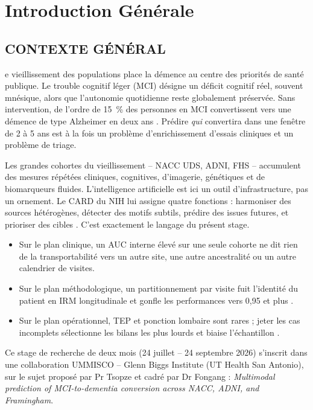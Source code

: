 \chapter*{Introduction Générale}
\label{chap:intro}
\adjustmtc

\section*{CONTEXTE GÉNÉRAL}
e vieillissement des populations place la démence au centre des priorités de santé publique. Le trouble cognitif léger (\ac{MCI}) désigne un déficit cognitif réel, souvent mnésique, alors que l'autonomie quotidienne reste globalement préservée. Sans intervention, de l'ordre de 15~\% des personnes en MCI convertissent vers une démence de type Alzheimer en deux ans \cite{chen2024probast,petersen2018mci}. Prédire \emph{qui} convertira dans une fenêtre de 2 à 5 ans est à la fois un problème d'enrichissement d'essais cliniques et un problème de triage.

Les grandes cohortes du vieillissement -- \ac{NACC} \ac{UDS}, \ac{ADNI}, \ac{FHS} -- accumulent des mesures répétées cliniques, cognitives, d'imagerie, génétiques et de biomarqueurs fluides. L'intelligence artificielle est ici un outil d'infrastructure, pas un ornement. Le \ac{CARD} du \ac{NIH} lui assigne quatre fonctions : harmoniser des sources hétérogènes, détecter des motifs subtils, prédire des issues futures, et prioriser des cibles \cite{card2024ai}. C'est exactement le langage du présent stage.

\begin{itemize}
\item Sur le plan clinique, un AUC interne élevé sur une seule cohorte ne dit rien de la transportabilité vers un autre site, une autre ancestralité ou un autre calendrier de visites.
\item Sur le plan méthodologique, un partitionnement par visite fuit l'identité du patient en IRM longitudinale et gonfle les performances vers 0,95 et plus \cite{yagis2023split,diagnostics2025leakage}.
\item Sur le plan opérationnel, TEP et ponction lombaire sont rares ; jeter les cas incomplets sélectionne les bilans les plus lourds et biaise l'échantillon \cite{park2025moira}.
\end{itemize}

Ce stage de recherche de deux mois (24 juillet -- 24 septembre 2026) s'inscrit dans une collaboration UMMISCO -- Glenn Biggs Institute (UT Health San Antonio), sur le sujet proposé par Pr Tsopze et cadré par Dr Fongang : \emph{Multimodal prediction of MCI-to-dementia conversion across NACC, ADNI, and Framingham}.

